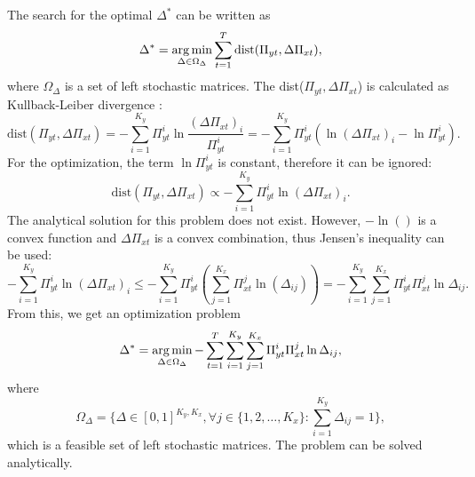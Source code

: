 The search for the optimal $\Delta^{*}$ can be written as
\begin{equation}
    \Delta^* = \operatorname*{arg\,min}_{\Delta \in \Omega_{\Delta}} \sum_{t=1}^T \text{dist}(\Pi_{yt}, \Delta\Pi_{xt}),
\end{equation}
where $\Omega_{\Delta}$ is a set of left stochastic matrices. The dist($\Pi_{yt}, \Delta\Pi_{xt}$) is calculated as Kullback-Leiber divergence \cite{Kullback1951}:
\begin{equation}
    \text{dist}(\Pi_{yt}, \Delta\Pi_{xt}) = - \sum_{i=1}^{K_y} \Pi_{yt}^i \ln\frac{(\Delta\Pi_{xt})_i}{\Pi_{yt}^i} = - \sum_{i=1}^{K_y} \Pi_{yt}^i (\ln (\Delta\Pi_{xt})_i - \ln \Pi_{yt}^i).
\end{equation}
For the optimization, the term $\ln \Pi_{yt}^i$ is constant, therefore it can be ignored:
\begin{equation}
    \text{dist}(\Pi_{yt}, \Delta\Pi_{xt}) \propto - \sum_{i=1}^{K_y} \Pi_{yt}^i \ln (\Delta\Pi_{xt})_i.
\end{equation}
The analytical solution for this problem does not exist. However, $-\ln()$ is a convex function and $\Delta\Pi_{xt}$ is a convex combination, thus Jensen's inequality can be used:
\begin{equation}
    - \sum_{i=1}^{K_y} \Pi_{yt}^i \ln (\Delta\Pi_{xt})_i \leq - \sum_{i=1}^{K_y} \Pi_{yt}^i ( \sum_{j=1}^{K_x} \Pi_{xt}^j \ln (\Delta_{ij}) ) = - \sum_{i=1}^{K_y} \sum_{j=1}^{K_x} \Pi_{yt}^i \Pi_{xt}^j \ln \Delta_{ij}.
\end{equation}
From this, we get an optimization problem
\begin{equation}
    \Delta^* = \operatorname*{arg\,min}_{\Delta \in \Omega_{\Delta}} - \sum_{t=1}^T \sum_{i=1}^{K_y} \sum_{j=1}^{K_x} \Pi_{yt}^i \Pi_{xt}^j \ln \Delta_{ij},
\end{equation}
where
\begin{equation}
    \Omega_{\Delta} = \{ \Delta \in [0, 1]^{K_y,K_x}, \forall j \in \{ 1, 2, \dots, K_x \} : \sum_{i=1}^{K_y} \Delta_{ij} = 1 \},
\end{equation}
which is a feasible set of left stochastic matrices. The problem can be solved analytically.

